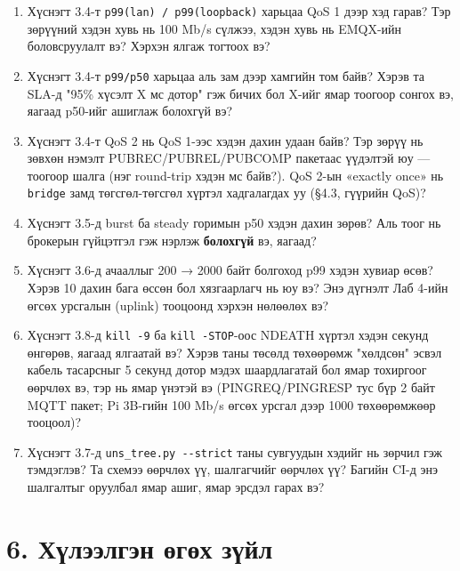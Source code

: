 \begin{enumerate}
\def\labelenumi{\arabic{enumi}.}
\item
  Хүснэгт 3.4-т \texttt{p99(lan)\ /\allowbreak{}\ p99(loopback)} харьцаа QoS 1 дээр хэд гарав? Тэр зөрүүний хэдэн хувь нь 100 Mb/s сүлжээ, хэдэн хувь нь EMQX-ийн боловсруулалт вэ? Хэрхэн ялгаж тогтоох вэ?
\item
  Хүснэгт 3.4-т \texttt{p99/p50} харьцаа аль зам дээр хамгийн том байв? Хэрэв та SLA-д "95\% хүсэлт X мс дотор" гэж бичих бол X-ийг ямар тоогоор сонгох вэ, яагаад p50-ийг ашиглаж болохгүй вэ?
\item
  Хүснэгт 3.4-т QoS 2 нь QoS 1-ээс хэдэн дахин удаан байв? Тэр зөрүү нь зөвхөн нэмэлт PUBREC/PUBREL/PUBCOMP пакетаас үүдэлтэй юу --- тоогоор шалга (нэг round-trip хэдэн мс байв?). QoS 2-ын «exactly once» нь \texttt{bridge} замд төгсгөл-төгсгөл хүртэл хадгалагдах уу (§4.3, гүүрийн QoS)?
\item
  Хүснэгт 3.5-д burst ба steady горимын p50 хэдэн дахин зөрөв? Аль тоог нь брокерын гүйцэтгэл гэж нэрлэж \textbf{болохгүй} вэ, яагаад?
\item
  Хүснэгт 3.6-д ачааллыг 200 → 2000 байт болгоход p99 хэдэн хувиар өсөв? Хэрэв 10 дахин бага өссөн бол хязгаарлагч нь юу вэ? Энэ дүгнэлт Лаб 4-ийн өгсөх урсгалын (uplink) тооцоонд хэрхэн нөлөөлөх вэ?
\item
  Хүснэгт 3.8-д \texttt{kill\ -9} ба \texttt{kill\ -STOP}-оос NDEATH хүртэл хэдэн секунд өнгөрөв, яагаад ялгаатай вэ? Хэрэв таны төсөлд төхөөрөмж "хөлдсөн" эсвэл кабель тасарсныг 5 секунд дотор мэдэх шаардлагатай бол ямар тохиргоог өөрчлөх вэ, тэр нь ямар үнэтэй вэ (PINGREQ/PINGRESP тус бүр 2 байт MQTT пакет; Pi 3B-гийн 100 Mb/s өгсөх урсгал дээр 1000 төхөөрөмжөөр тооцоол)?
\item
  Хүснэгт 3.7-д \texttt{uns\_\allowbreak{}tree.\allowbreak{}py\ -\/\allowbreak{}-strict} таны сувгуудын хэдийг нь зөрчил гэж тэмдэглэв? Та схемээ өөрчлөх үү, шалгагчийг өөрчлөх үү? Багийн CI-д энэ шалгалтыг оруулбал ямар ашиг, ямар эрсдэл гарах вэ?
\end{enumerate}

\hypertarget{ux445ux4afux43bux44dux44dux43bux433ux44dux43d-ux4e9ux433ux4e9ux445-ux437ux4afux439ux43b}{%
\section{6. Хүлээлгэн өгөх зүйл}\label{ux445ux4afux43bux44dux44dux43bux433ux44dux43d-ux4e9ux433ux4e9ux445-ux437ux4afux439ux43b}}

